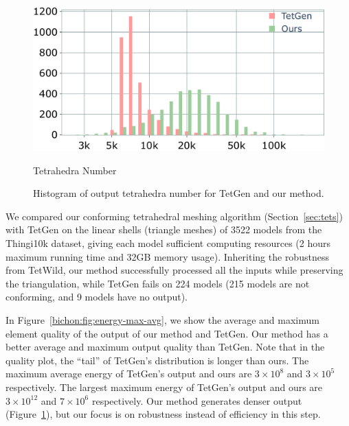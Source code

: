 \begin{figure}
    \centering
    \parbox{.7\linewidth}{\centering
    \parbox{0.02\linewidth}{\centering{}}\hfill
    \parbox{.95\linewidth}{\includegraphics[width=\linewidth]{curve_meshing_in_shell_tex/figs/stats/tetgen_TO}}\par
    \scriptsize{Tetrahedra Number}
    }
    \caption{Histogram of output tetrahedra number for TetGen and {our} method. }
    \label{bichon:fig:numt}
\end{figure}

We compared our conforming tetrahedral meshing algorithm (Section~\ref{sec:tets}) with TetGen on the linear shells (triangle meshes) of 3522 models from the Thingi10k dataset, giving each model sufficient computing resources (2 hours maximum running time and 32GB memory usage). Inheriting the robustness from TetWild, our method successfully processed all the inputs while preserving the triangulation, while TetGen fails on 224 models (215 models are not conforming, and 9 models have no output).


In Figure~\ref{bichon:fig:energy-max-avg}, we show the average and maximum element quality of the output of our method and TetGen. Our method has {a} better average and maximum output quality than TetGen. Note that in the quality plot, the ``tail'' of TetGen's distribution is longer than ours. The maximum average energy of TetGen's output and ours are $3\times 10^8$ and $3 \times 10^5$ respectively. The largest maximum energy of TetGen's output and ours are $3\times 10^{12}$ and $7 \times 10^6$ respectively. Our method generates denser output (Figure~\ref{bichon:fig:numt}), but our focus is on robustness instead of efficiency in this step.

